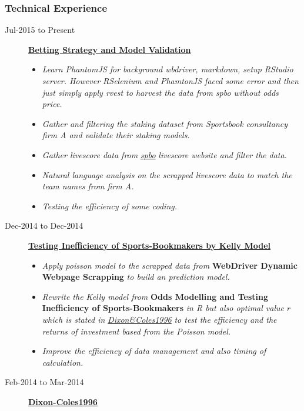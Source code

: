 \documentclass[]{article}
\providecommand{\tightlist}{%
  \setlength{\itemsep}{0pt}\setlength{\parskip}{0pt}}
\begin{document}
\subsubsection{Technical Experience}\label{technical-experience}

\begin{description}
\item[Jul-2015 to Present]
\href{https://github.com/Scibrokes/Betting-Strategy-and-Model-Validation}{\textbf{Betting
Strategy and Model Validation}}

\begin{itemize}
\tightlist
\item
  \emph{Learn PhantomJS for background wbdriver, markdown, setup RStudio
  server. However RSelenium and PhamtonJS faced some error and then just
  simply apply rvest to harvest the data from spbo without odds price.}
\item
  \emph{Gather and filtering the staking dataset from Sportsbook
  consultancy firm A and validate their staking models.}
\item
  \emph{Gather livescore data from}
  \href{http://www.spbo.com/eend0.htm}{\emph{spbo}} \emph{livescore
  website and filter the data.}
\item
  \emph{Natural language analysis on the scrapped livescore data to
  match the team names from firm A.}
\item
  \emph{Testing the efficiency of some coding.}
\end{itemize}
\item[Dec-2014 to Dec-2014]
\href{https://github.com/Scibrokes/Kelly-Criterion}{\textbf{Testing
Inefficiency of Sports-Bookmakers by Kelly Model}}

\begin{itemize}
\tightlist
\item
  \emph{Apply poisson model to the scrapped data from} \textbf{WebDriver
  Dynamic Webpage Scrapping} \emph{to build an prediction model.}
\item
  \emph{Rewrite the Kelly model from} \textbf{Odds Modelling and Testing
  Inefficiency of Sports-Bookmakers} \emph{in R but also optimal value}
  \(r\) \emph{which is stated in}
  \href{http://www.math.ku.dk/~rolf/teaching/thesis/DixonColes.pdf}{\emph{Dixon\&Coles1996}}
  \emph{to test the efficiency and the returns of investment based from
  the Poisson model.}
\item
  \emph{Improve the efficiency of data management and also timing of
  calculation.}
\end{itemize}
\item[Feb-2014 to Mar-2014]
\href{https://github.com/Scibrokes/Dixon-Coles1996}{\textbf{Dixon-Coles1996}}


\end{description}
\end{document}
